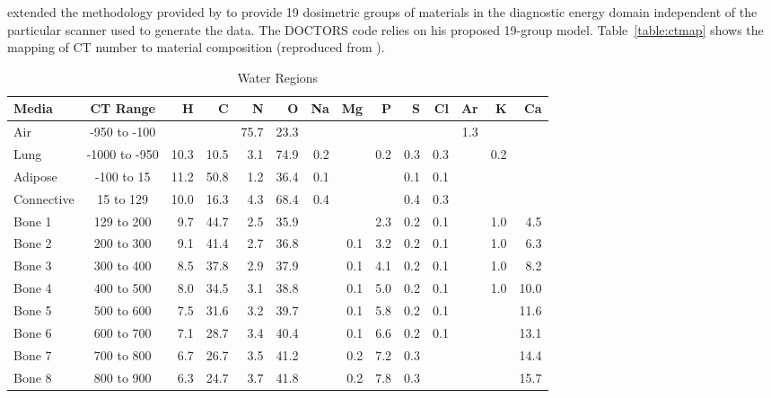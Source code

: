\citet{ref:ottossonr} extended the methodology provided by \citet{ref:schneideru} to provide 19 dosimetric groups of materials in the diagnostic energy domain independent of the particular scanner used to generate the data. The DOCTORS code relies on his proposed 19-group model. Table~\ref{table:ctmap} shows the mapping of CT number to material composition (reproduced from \citet{ref:ottossonr}).

\begin{sidewaystable}[ht]
\caption{Water Regions}
\centering 
\begin{tabular}{l c r r r r r r r r r r r r}
\hline \hline   
Media       & CT Range      & H    & C    & N    & O    & Na  & Mg  & P    & S   & Cl  & Ar  & K   & Ca \\ [0.5ex] 
\hline
Air         & -950 to -100  &      &      & 75.7 & 23.3 &     &     &      &     &     & 1.3 &     &      \\
Lung        & -1000 to -950 & 10.3 & 10.5 &  3.1 & 74.9 & 0.2 &     &  0.2 & 0.3 & 0.3 &     & 0.2 &      \\
Adipose     & -100 to 15    & 11.2 & 50.8 &  1.2 & 36.4 & 0.1 &     &      & 0.1 & 0.1 &     &     &      \\
Connective  & 15 to 129     & 10.0 & 16.3 &  4.3 & 68.4 & 0.4 &     &      & 0.4 & 0.3 &     &     &      \\
Bone 1      & 129 to 200    &  9.7 & 44.7 &  2.5 & 35.9 &     &     &  2.3 & 0.2 & 0.1 &     & 1.0 &  4.5 \\ 
Bone 2      & 200 to 300    &  9.1 & 41.4 &  2.7 & 36.8 &     & 0.1 &  3.2 & 0.2 & 0.1 &     & 1.0 &  6.3 \\ 
Bone 3      & 300 to 400    &  8.5 & 37.8 &  2.9 & 37.9 &     & 0.1 &  4.1 & 0.2 & 0.1 &     & 1.0 &  8.2 \\ 
Bone 4      & 400 to 500    &  8.0 & 34.5 &  3.1 & 38.8 &     & 0.1 &  5.0 & 0.2 & 0.1 &     & 1.0 & 10.0 \\ 
Bone 5      & 500 to 600    &  7.5 & 31.6 &  3.2 & 39.7 &     & 0.1 &  5.8 & 0.2 & 0.1 &     &     & 11.6 \\ 
Bone 6      & 600 to 700    &  7.1 & 28.7 &  3.4 & 40.4 &     & 0.1 &  6.6 & 0.2 & 0.1 &     &     & 13.1 \\ 
Bone 7      & 700 to 800    &  6.7 & 26.7 &  3.5 & 41.2 &     & 0.2 &  7.2 & 0.3 &     &     &     & 14.4 \\ 
Bone 8      & 800 to 900    &  6.3 & 24.7 &  3.7 & 41.8 &     & 0.2 &  7.8 & 0.3 &     &     &     & 15.7 \\ 

\end{tabular}
\end{sidewaystable}
